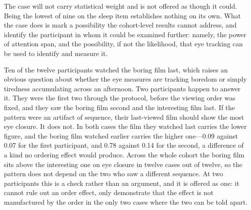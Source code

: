 The case will not carry statistical weight and is not offered as though it could. Being the
lowest of nine on the sleep item establishes nothing on its own. What the case does is mark a
possibility the cohort-level results cannot address, and identify the participant in whom it
could be examined further: namely, the power of attention span, and the possibility, if not the
likelihood, that eye tracking can be used to identify and measure it.

%
%

Ten of the twelve participants watched the boring film last, which raises an obvious question
about whether the eye measures are tracking boredom or simply tiredness accumulating across an
afternoon. Two participants happen to answer it. They were the first two through the protocol,
before the viewing order was fixed, and they saw the boring film second and the interesting
film last. If the pattern were an artifact of sequence, their last-viewed film should show the
most eye closure. It does not. In both cases the film they watched last carries the lower
figure, and the boring film watched earlier carries the higher one---0.09 against 0.07 for the
first participant, and 0.78 against 0.14 for the second, a difference of a kind no ordering
effect would produce. Across the whole cohort the boring film sits above the interesting one on
eye closure in twelve cases out of twelve, so the pattern does not depend on the two who saw a
different sequence. At two participants this is a check rather than an argument, and it is
offered as one: it cannot rule out an order effect, only demonstrate that the effect is not
manufactured by the order in the only two cases where the two can be told apart.

